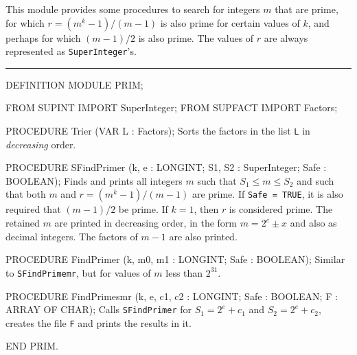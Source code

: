 
This module provides some procedures to search for integers
$m$ that are prime, for which $r = (m^k-1)/(m-1)$ is also prime
for certain values of $k$, and perhaps for which $(m-1)/2$ is also
prime.  The values of $r$ are always represented as {\tt SuperInteger}'s.

\bigskip\hrule
\code

DEFINITION MODULE PRIM;

FROM SUPINT   IMPORT SuperInteger;
FROM SUPFACT  IMPORT Factors;


PROCEDURE Trier (VAR L : Factors);
\endcode
 \tab 
  Sorts the factors in the list {\tt L} in {\em decreasing\/} order.
 \endtab
\code

PROCEDURE SFindPrimer (k, e : LONGINT;  S1, S2 : SuperInteger;  
                       Safe : BOOLEAN);
\endcode
 \tab
  Finds and prints all integers $m$ such that $S_1 \le m \le S_2$ and    
  such that both $m$ and $r = (m^k-1)/(m-1)$ are prime.   
  If {\tt Safe = TRUE}, it is also required that $(m-1) / 2$ be prime.
  If $k=1$, then $r$ is considered prime.  
  The retained $m$ are printed in decreasing order,
  in the form $m = 2^e \pm x$ and also as decimal integers. 
  The factors of $m-1$ are also printed.
 \endtab
\code

PROCEDURE FindPrimer (k, m0, m1 : LONGINT;  Safe : BOOLEAN);
\endcode
 \tab
  Similar to {\tt SFindPrimemr}, but for values of $m$ less than 
  $2^{31}$.
 \endtab
\code

PROCEDURE FindPrimesmr 
      (k, e, c1, c2 : LONGINT;  Safe : BOOLEAN;   F : ARRAY OF CHAR);
\endcode
 \tab
   Calls {\tt SFindPrimer} for $S_1 = 2^e + c_1$ and $S_2 = 2^e + c_2$, 
   creates the file {\tt F} and prints the results in it.
 \endtab
\code

END PRIM.
\endcode


